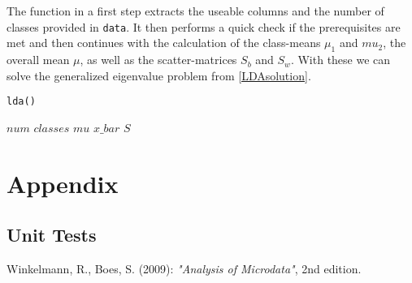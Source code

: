 \documentclass{article}
\begin{document}
The function in a first step extracts the useable columns and the number of classes provided in \texttt{data}. It then performs a quick check if the prerequisites are met and then continues with the calculation of the class-means $\mu_1$ and $mu_2$, the overall mean $\mu$, as well as the scatter-matrices $S_b$ and $S_w$. With these we can solve the generalized eigenvalue problem from \ref{LDAsolution}.

\begin{algorithm}
\caption{\texttt{lda()}} \label{lda-function}
\begin{algorithmic}[1]
\State $\textit{num}$
\State $\textit{classes}$
\State $\textit{mu}$
\State $\textit{x\_bar}$
\State $\textit{S}$
\EndProcedure


\end{algorithmic}
\end{algorithm}

\section{Appendix}

\subsection{Unit Tests}


\begin{thebibliography}{9}
  Winkelmann, R., Boes, S. (2009): \textit{"Analysis of Microdata"}, 2nd edition.
\end{thebibliography}
\end{document}

